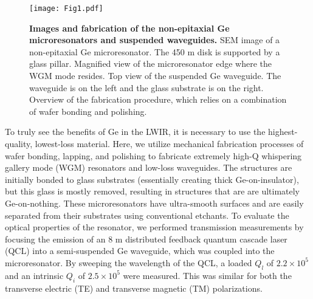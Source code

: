 \documentclass[fleqn,10pt,twocolumn]{wlscirep}
\begin{document}
\begin{figure*}[ht!]
\centering\texttt{[image: Fig1.pdf]}
\caption{\label{fig:fab}\textbf{Images and fabrication of the non-epitaxial Ge microresonators and suspended waveguides.}  SEM image of a non-epitaxial Ge microresonator. The 450 \micro m disk is supported by a glass pillar.  Magnified view of the microresonator edge where the WGM mode resides.  Top view of the suspended Ge waveguide. The waveguide is on the left and the glass substrate is on the right.  Overview of the fabrication procedure, which relies on a combination of wafer bonding and polishing.
}
\end{figure*}

To truly see the benefits of Ge in the LWIR, it is necessary to use the highest-quality, lowest-loss material. Here, we utilize mechanical fabrication processes of wafer bonding, lapping, and polishing to fabricate extremely high-Q whispering gallery mode (WGM) resonators and low-loss waveguides. The structures are initially bonded to glass substrates (essentially creating thick Ge-on-insulator), but this glass is mostly removed, resulting in structures that are are ultimately Ge-on-nothing. These microresonators have ultra-smooth surfaces and are easily separated from their substrates using conventional etchants. To evaluate the optical properties of the resonator, we performed transmission measurements by focusing the emission of an 8 \micro m distributed feedback quantum cascade laser (QCL) into a semi-suspended Ge waveguide, which was coupled into the microresonator. By sweeping the wavelength of the QCL, a loaded \emph{$Q_{l}$} of $2.2 \times 10^{5}$ and an intrinsic \emph{$Q_{i}$} of $2.5 \times 10^{5}$ were measured. This was similar for both the transverse electric (TE) and transverse magnetic (TM) polarizations.
\end{document}
